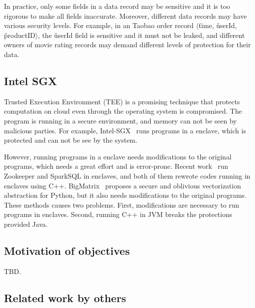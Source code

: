 In practice, only some fields in a data record may be sensitive and it is too 
rigorous
to make all fields inaccurate. Moreover, different data records may have various
security levels.
For example, in an Taobao order record $\langle$\v{time},
\v{userId}, \v{productID}$\rangle$, the \v{userId} field is sensitive
and it must not be leaked, and different owners of movie rating records may 
demand different
levels of protection for their data.

\vspace{-.15in}\subsection{Intel SGX}
\label{sec:sgx}\vspace{-.075in}

Trusted Execution Environment (TEE) is a promising technique that
protects computation on cloud even through the operating system is
compromised. The program is running in a secure environment, and memory can not
be seen by malicious parties. For example, Intel-SGX~\cite{intel-sgx} runs 
programs
in a enclave, which is protected and can not be see by the system.

However, running programs in a enclave needs modifications to the original
programs, which needs a great effort and is error-prone. Recent
work~\cite{securekeeper,opaque:nsdi17} run Zookeeper and SparkSQL in enclaves,
and both of them rewrote codes running in enclaves using C++.
BigMatrix~\cite{bigmatrix:ccs17} proposes a secure and oblivious vectorization
abstraction for Python, but it also needs modifications to the original 
programs.
These methods causes two problems. First, modifications are necessary to run
programs in enclaves. Second, running C++ in JVM breaks the protections
provided Java.

\vspace{-.15in}\subsection{Motivation of objectives} 
\label{sec:motivation}\vspace{-.075in}
TBD.

\subsection{Related work by others} 
\label{sec:others-work}\vspace{-.075in}

